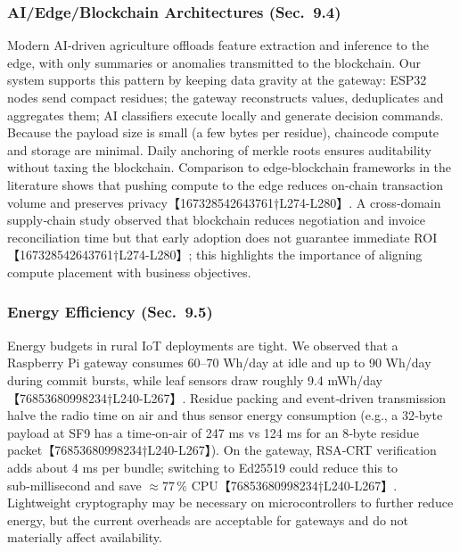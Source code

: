 \documentclass[12pt,onecolumn]{IEEEtran} %
\begin{document}
\subsubsection{AI/Edge/Blockchain Architectures (Sec.~9.4)}
Modern AI‑driven agriculture offloads feature extraction and inference to the edge, with only summaries or anomalies transmitted to the blockchain.  Our system supports this pattern by keeping data gravity at the gateway: ESP32 nodes send compact residues; the gateway reconstructs values, deduplicates and aggregates them; AI classifiers execute locally and generate decision commands.  Because the payload size is small (a few bytes per residue), chaincode compute and storage are minimal.  Daily anchoring of merkle roots ensures auditability without taxing the blockchain.  Comparison to edge‑blockchain frameworks in the literature shows that pushing compute to the edge reduces on‑chain transaction volume and preserves privacy【167328542643761†L274-L280】.  A cross‑domain supply‑chain study observed that blockchain reduces negotiation and invoice reconciliation time but that early adoption does not guarantee immediate ROI【167328542643761†L274-L280】; this highlights the importance of aligning compute placement with business objectives.

\subsubsection{Energy Efficiency (Sec.~9.5)}
Energy budgets in rural IoT deployments are tight.  We observed that a Raspberry Pi gateway consumes 60–70 Wh/day at idle and up to 90 Wh/day during commit bursts, while leaf sensors draw roughly 9.4 mWh/day【76853680998234†L240-L267】.  Residue packing and event‑driven transmission halve the radio time on air and thus sensor energy consumption (e.g., a 32‑byte payload at SF9 has a time‑on‑air of 247 ms vs 124 ms for an 8‑byte residue packet【76853680998234†L240-L267】).  On the gateway, RSA‑CRT verification adds about 4 ms per bundle; switching to Ed25519 could reduce this to sub‑millisecond and save \(\approx77\,\%\) CPU【76853680998234†L240-L267】.  Lightweight cryptography may be necessary on microcontrollers to further reduce energy, but the current overheads are acceptable for gateways and do not materially affect availability.
\end{document}
